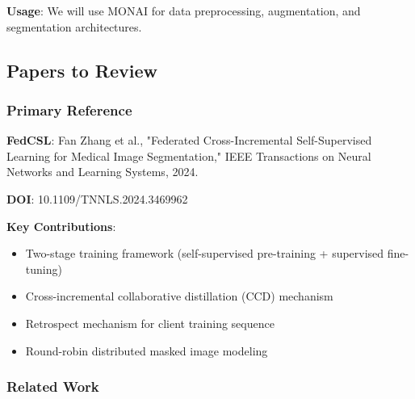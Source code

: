 \documentclass[conference]{IEEEtran}
\begin{document}
\textbf{Usage}: We will use MONAI for data preprocessing, augmentation, and segmentation architectures.

\subsection{Papers to Review}

\subsubsection{Primary Reference}

\textbf{FedCSL}: Fan Zhang et al., "Federated Cross-Incremental Self-Supervised Learning for Medical Image Segmentation," IEEE Transactions on Neural Networks and Learning Systems, 2024.

\textbf{DOI}: 10.1109/TNNLS.2024.3469962

\textbf{Key Contributions}:
\begin{itemize}
    \item Two-stage training framework (self-supervised pre-training + supervised fine-tuning)
    \item Cross-incremental collaborative distillation (CCD) mechanism
    \item Retrospect mechanism for client training sequence
    \item Round-robin distributed masked image modeling
\end{itemize}

\subsubsection{Related Work}
\end{document}
